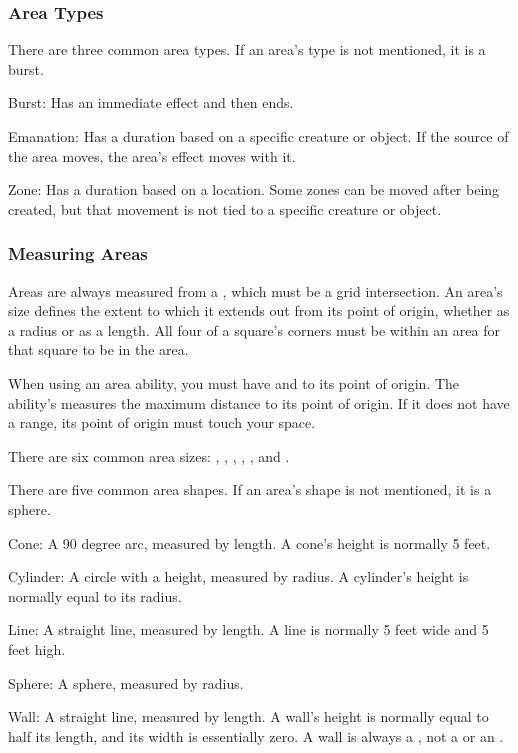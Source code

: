     \subsubsection{Area Types}\label{Area Types}
      There are three common area types.
      If an area's type is not mentioned, it is a burst.
      \begin{raggeditemize}
        \item Burst: Has an immediate effect and then ends.
        \item Emanation: Has a duration based on a specific creature or object. If the source of the area moves, the area's effect moves with it.
        \item Zone: Has a duration based on a location. Some zones can be moved after being created, but that movement is not tied to a specific creature or object.
      \end{raggeditemize}

    \subsubsection{Measuring Areas}
      Areas are always measured from a , which must be a grid intersection.
      An area's size defines the extent to which it extends out from its point of origin, whether as a radius or as a length.
      All four of a square's corners must be within an area for that square to be in the area.

      When using an area ability, you must have  and  to its point of origin.
      The ability's  measures the maximum distance to its point of origin.
      If it does not have a range, its point of origin must touch your space.

      There are six common area sizes: \tinyarea, \smallarea, \medarea, \largearea, \hugearea, and \gargarea.

      There are five common area shapes.
      If an area's shape is not mentioned, it is a sphere.
      \begin{raggeditemize}
        \item Cone: A 90 degree arc, measured by length. A cone's height is normally 5 feet.
        \item Cylinder: A circle with a height, measured by radius. A cylinder's height is normally equal to its radius.
        \item Line: A straight line, measured by length. A line is normally 5 feet wide and 5 feet high.
        \item Sphere: A sphere, measured by radius.
        \item Wall: A straight line, measured by length. A wall's height is normally equal to half its length, and its width is essentially zero. A wall is always a , not a  or an .
      \end{raggeditemize}

